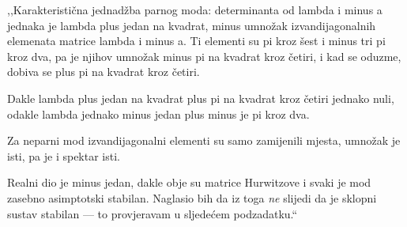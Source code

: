 \begin{izgovor}
,,Karakteristična jednadžba parnog moda: determinanta od lambda i minus a jednaka
je lambda plus jedan na kvadrat, minus umnožak izvandijagonalnih elemenata
matrice lambda i minus a. Ti elementi su pi kroz šest i minus tri pi kroz dva, pa
je njihov umnožak minus pi na kvadrat kroz četiri, i kad se oduzme, dobiva se
plus pi na kvadrat kroz četiri.

Dakle lambda plus jedan na kvadrat plus pi na kvadrat kroz četiri jednako nuli,
odakle lambda jednako minus jedan plus minus je pi kroz dva.

Za neparni mod izvandijagonalni elementi su samo zamijenili mjesta, umnožak je
isti, pa je i spektar isti.

Realni dio je minus jedan, dakle obje su matrice Hurwitzove i svaki je mod
zasebno asimptotski stabilan. Naglasio bih da iz toga \emph{ne} slijedi da je
sklopni sustav stabilan --- to provjeravam u sljedećem podzadatku.``
\end{izgovor}

